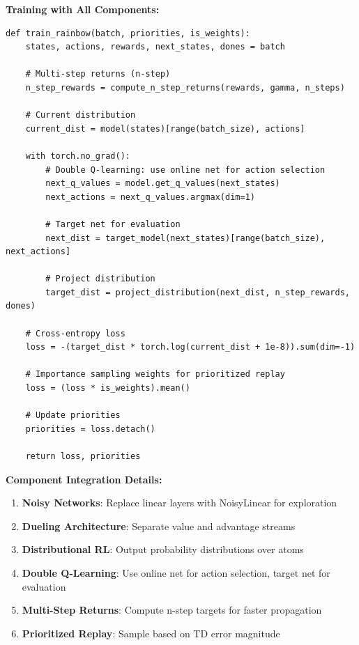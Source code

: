 \documentclass[12pt]{article}
\begin{document}
{{\textbf{Training with All Components:}

\begin{verbatim}
def train_rainbow(batch, priorities, is_weights):
    states, actions, rewards, next_states, dones = batch
    
    # Multi-step returns (n-step)
    n_step_rewards = compute_n_step_returns(rewards, gamma, n_steps)
    
    # Current distribution
    current_dist = model(states)[range(batch_size), actions]
    
    with torch.no_grad():
        # Double Q-learning: use online net for action selection
        next_q_values = model.get_q_values(next_states)
        next_actions = next_q_values.argmax(dim=1)
        
        # Target net for evaluation
        next_dist = target_model(next_states)[range(batch_size), next_actions]
        
        # Project distribution
        target_dist = project_distribution(next_dist, n_step_rewards, dones)
    
    # Cross-entropy loss
    loss = -(target_dist * torch.log(current_dist + 1e-8)).sum(dim=-1)
    
    # Importance sampling weights for prioritized replay
    loss = (loss * is_weights).mean()
    
    # Update priorities
    priorities = loss.detach()
    
    return loss, priorities
\end{verbatim}

\textbf{Component Integration Details:}

\begin{enumerate}
\item \textbf{Noisy Networks}: Replace linear layers with NoisyLinear for exploration
\item \textbf{Dueling Architecture}: Separate value and advantage streams
\item \textbf{Distributional RL}: Output probability distributions over atoms
\item \textbf{Double Q-Learning}: Use online net for action selection, target net for evaluation
\item \textbf{Multi-Step Returns}: Compute n-step targets for faster propagation
\item \textbf{Prioritized Replay}: Sample based on TD error magnitude
\end{enumerate}

}}
\end{document}
